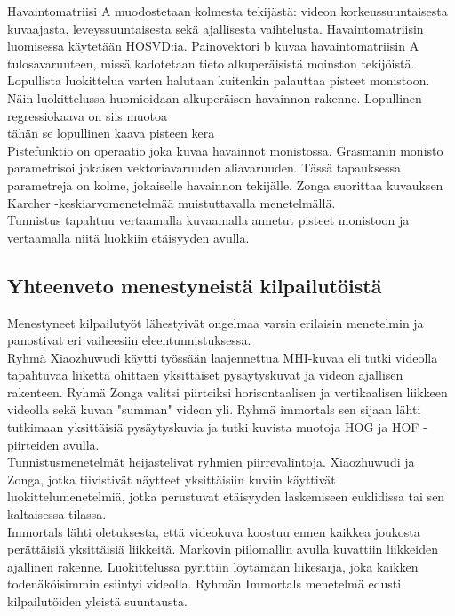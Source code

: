 Havaintomatriisi A muodostetaan kolmesta tekijästä: videon korkeussuuntaisesta kuvaajasta, leveyssuuntaisesta sekä ajallisesta vaihtelusta.
Havaintomatriisin luomisessa käytetään HOSVD:ia. Painovektori b kuvaa havaintomatriisin A tulosavaruuteen, missä kadotetaan tieto alkuperäisistä moinston tekijöistä. 
Lopullista luokittelua varten halutaan kuitenkin palauttaa pisteet monistoon.
Näin luokittelussa huomioidaan alkuperäisen havainnon rakenne. 
Lopullinen regressiokaava on siis muotoa\\
tähän se lopullinen kaava pisteen kera\\
Pistefunktio on operaatio joka kuvaa havainnot monistossa. Grasmanin monisto parametrisoi jokaisen vektoriavaruuden aliavaruuden.
Tässä tapauksessa parametreja on kolme, jokaiselle havainnon tekijälle.
Zonga suorittaa kuvauksen Karcher -keskiarvomenetelmää muistuttavalla menetelmällä.\\

Tunnistus tapahtuu vertaamalla kuvaamalla annetut pisteet monistoon ja vertaamalla niitä luokkiin etäisyyden avulla. \citep {6239180}\\


\subsection{Yhteenveto menestyneistä kilpailutöistä}
Menestyneet kilpailutyöt lähestyivät ongelmaa varsin erilaisin menetelmin ja panostivat eri vaiheesiin eleentunnistuksessa.\\
 
Ryhmä Xiaozhuwudi käytti työssään laajennettua MHI-kuvaa eli tutki videolla tapahtuvaa liikettä ohittaen yksittäiset pysäytyskuvat ja videon ajallisen rakenteen.
Ryhmä Zonga valitsi piirteiksi horisontaalisen ja vertikaalisen liikkeen videolla sekä kuvan "summan" videon yli. 
Ryhmä immortals sen sijaan lähti tutkimaan yksittäisiä pysäytyskuvia ja tutki kuvista muotoja HOG ja HOF -piirteiden avulla.\\

Tunnistusmenetelmät heijastelivat ryhmien piirrevalintoja. Xiaozhuwudi ja Zonga, jotka tiivistivät näytteet 
yksittäisiin kuviin käyttivät luokittelumenetelmiä, jotka perustuvat etäisyyden laskemiseen 
euklidissa tai sen kaltaisessa tilassa. \\

Immortals lähti oletuksesta, että videokuva koostuu ennen kaikkea joukosta perättäisiä yksittäisiä liikkeitä.
Markovin piilomallin avulla kuvattiin liikkeiden ajallinen rakenne. Luokittelussa pyrittiin löytämään 
liikesarja, joka kaikken todenäköisimmin esiintyi videolla. Ryhmän Immortals menetelmä edusti kilpailutöiden yleistä suuntausta.\\


